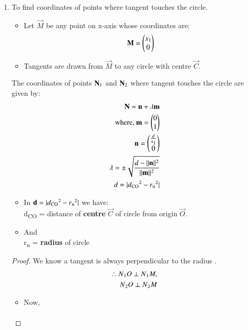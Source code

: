 \documentclass[journal,12pt,twocolumn]{IEEEtran}
\begin{document}
\begin{enumerate}
    \item To find coordinates of points where tangent touches the circle.
\begin{itemize}
    \item Let $\vec{M}$ be any point on x-axis whose coordinates are:
    \begin{align}
    \vec{M} =\myvec{x\textsubscript{1} \\0} \label{eq1}
    \end{align}
    \item Tangents are drawn from $\vec{M}$ to any circle with centre $\vec{C}$.
\end{itemize}
\begin{lemma}
\label{lemma}
The coordinates of points $\vec{N\textsubscript{1}}$ and $\vec{N\textsubscript{2}}$ where tangent touches the circle are given by:
\begin{align}
\vec{N}=\vec{n}+\lambda \vec{m} \label{eq2}
\\
\text{where, }\vec{m}=\myvec{0\\1} 
\\
\vec{n}=\myvec{\frac{d}{x\textsubscript{1}}\\0}
\\
\lambda = \pm\sqrt{\frac{d-\norm{\vec{n}}^2}{\norm{\vec{m}}^2}}
\\
d=\abs{d\textsubscript{CO}^2-r\textsubscript{n}^2}
\end{align}
\begin{itemize}
    \item In $\vec{d}=\abs{d\textsubscript{CO}^2-r\textsubscript{n}^2}$ we have:
    \\
    d\textsubscript{CO} = distance of \textbf{centre} $\vec{C}$ of circle from origin $\vec{O}$.
    \item And 
    \\
    r\textsubscript{n} = \textbf{radius} of circle
\end{itemize}
\end{lemma}
\begin{proof}
We know a tangent is always perpendicular to the radius .
\begin{align}
\therefore N\textsubscript{1}O \perp N\textsubscript{1}M, 
\\
N\textsubscript{2}O \perp N\textsubscript{2}M
\end{align}
\begin{itemize}
\item Now,
\begin{align}

\end{align}
\end{itemize}
\end{proof}
\end{enumerate}
\end{document}
